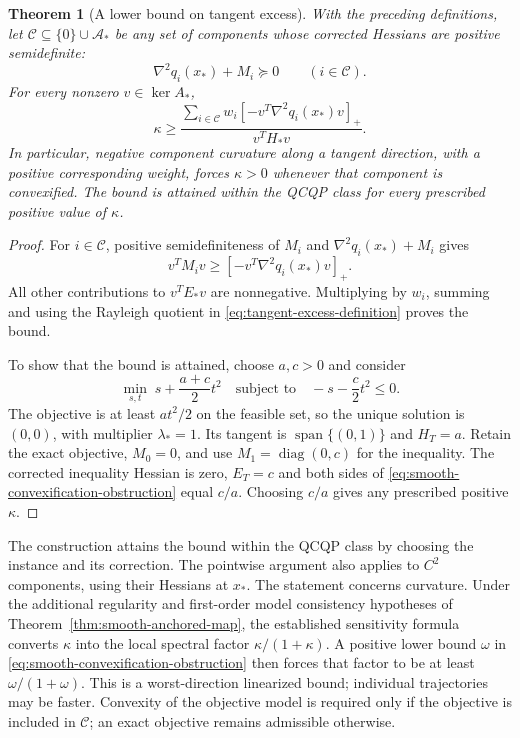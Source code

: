\documentclass[pdflatex,sn-mathphys-num]{sn-jnl}
\theoremstyle{thmstyleone}
\newtheorem{theorem}{Theorem}[section]
\theoremstyle{thmstylethree}
\begin{document}
\begin{theorem}[A lower bound on tangent excess]
\label{cor:smooth-convexification-obstruction}
With the preceding definitions, let
$\mathcal C\subseteq\{0\}\cup\mathcal A_*$ be any set of components
whose corrected Hessians are positive semidefinite:
\[
 \nabla^2q_i(x_*)+M_i\succeq0\qquad(i\in\mathcal C).
\]
For every nonzero $v\in\ker A_*$,
\begin{equation}\label{eq:smooth-convexification-obstruction}
 \kappa\geq
 \frac{\displaystyle\sum_{i\in\mathcal C}
          w_i[-v^T\nabla^2q_i(x_*)v]_+}{v^TH_*v}.
\end{equation}
In particular, negative component curvature along a tangent direction,
with a positive corresponding weight, forces $\kappa>0$ whenever
that component is convexified. The bound is attained within the QCQP
class for every prescribed positive value of $\kappa$.
\end{theorem}
\begin{proof}
For $i\in\mathcal C$, positive semidefiniteness of $M_i$ and
$\nabla^2q_i(x_*)+M_i$ gives
\[
 v^TM_iv\geq[-v^T\nabla^2q_i(x_*)v]_+.
\]
All other contributions to $v^TE_*v$ are nonnegative. Multiplying by
$w_i$, summing and using the Rayleigh quotient in
\eqref{eq:tangent-excess-definition} proves the bound.

To show that the bound is attained, choose $a,c>0$ and consider
\begin{equation}\label{eq:attainment-qcqp}
 \min_{s,t}\;s+\frac{a+c}{2}t^2
 \quad\text{subject to}\quad -s-\frac c2t^2\leq0.
\end{equation}
The objective is at least $at^2/2$ on the feasible set, so the unique
solution is $(0,0)$, with multiplier $\lambda_*=1$. Its tangent is
$\operatorname{span}\{(0,1)\}$ and $H_T=a$. Retain the exact
objective, $M_0=0$, and use $M_1=\operatorname{diag}(0,c)$ for the
inequality. The corrected inequality Hessian is zero, $E_T=c$ and
both sides of \eqref{eq:smooth-convexification-obstruction} equal
$c/a$. Choosing $c/a$ gives any prescribed positive $\kappa$.
\end{proof}

The construction attains the bound within the QCQP class by choosing
the instance and its correction. The pointwise argument also applies
to $C^2$ components, using their Hessians at $x_*$. The statement concerns curvature. Under the additional regularity and
first-order model consistency hypotheses of Theorem~\ref{thm:smooth-anchored-map}, the
established sensitivity formula converts $\kappa$ into the local
spectral factor $\kappa/(1+\kappa)$. A positive lower bound $\omega$
in \eqref{eq:smooth-convexification-obstruction} then forces that
factor to be at least $\omega/(1+\omega)$. This is a worst-direction
linearized bound; individual trajectories may be faster. Convexity of
the objective model is required only if the objective is included in
$\mathcal C$; an exact objective remains admissible otherwise.
\end{document}
